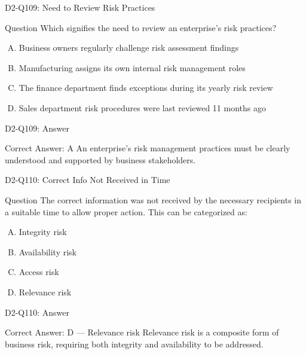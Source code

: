 \documentclass{beamer}
\begin{document}
	\begin{frame}{D2-Q109: Need to Review Risk Practices}
		\begin{block}{Question}
			Which signifies the need to review an enterprise's risk practices?
		\end{block}
		\begin{enumerate}[(A)]
			\item Business owners regularly challenge risk assessment findings
			\item Manufacturing assigns its own internal risk management roles
			\item The finance department finds exceptions during its yearly risk review
			\item Sales department risk procedures were last reviewed 11 months ago
		\end{enumerate}
	\end{frame}
	\begin{frame}{D2-Q109: Answer}
		\begin{block}{Correct Answer: A}
			An enterprise's risk management practices must be clearly understood and supported by business stakeholders.
		\end{block}
	\end{frame}
	
	\begin{frame}{D2-Q110: Correct Info Not Received in Time}
		\begin{block}{Question}
			The correct information was not received by the necessary recipients in a suitable time to allow proper action. This can be categorized as:
		\end{block}
		\begin{enumerate}[(A)]
			\item Integrity risk
			\item Availability risk
			\item Access risk
			\item Relevance risk
		\end{enumerate}
	\end{frame}
	\begin{frame}{D2-Q110: Answer}
		\begin{block}{Correct Answer: D --- Relevance risk}
			Relevance risk is a composite form of business risk, requiring both integrity and availability to be addressed.
		\end{block}
	\end{frame}
	
\end{document}
